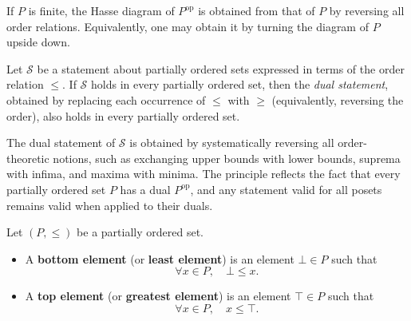 \begin{remark}
If $P$ is finite, the Hasse diagram of $P^{\mathrm{op}}$ is obtained from that of $P$ by reversing all order relations. Equivalently, one may obtain it by turning the diagram of $P$ upside down.
\end{remark}


\begin{proposition}
Let $\mathcal{S}$ be a statement about partially ordered sets expressed in terms of the order relation $\le$. If $\mathcal{S}$ holds in every partially ordered set, then the \emph{dual statement}, obtained by replacing each occurrence of $\le$ with $\ge$ (equivalently, reversing the order), also holds in every partially ordered set.
\end{proposition}

\begin{remark}[Interpretation]
The dual statement of $\mathcal{S}$ is obtained by systematically reversing all order-theoretic notions, such as exchanging upper bounds with lower bounds, suprema with infima, and maxima with minima. The principle reflects the fact that every partially ordered set $P$ has a dual $P^{\mathrm{op}}$, and any statement valid for all posets remains valid when applied to their duals.
\end{remark}


\begin{definition}
Let $(P,\le)$ be a partially ordered set.

\begin{itemize}
    \item A \textbf{bottom element} (or \textbf{least element}) is an element $\bot \in P$ such that
    \[
    \forall x \in P, \quad \bot \le x.
    \]

    \item A \textbf{top element} (or \textbf{greatest element}) is an element $\top \in P$ such that
    \[
    \forall x \in P, \quad x \le \top.
    \]
\end{itemize}
\end{definition}

